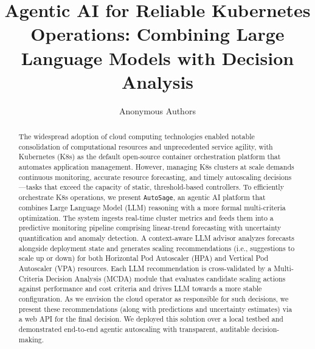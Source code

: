 \documentclass[sigconf]{acmart}
\newcommand{\Solution}{\texttt{AutoSage}}
\begin{document}
\title{Agentic AI for Reliable Kubernetes Operations: Combining Large Language Models with Decision Analysis
}

\author{Anonymous Authors}

\begin{abstract}
The widespread adoption of cloud computing technologies enabled notable consolidation of computational resources and unprecedented service agility, with Kubernetes (K8s) as the default open-source container orchestration platform that automates application management. However, managing K8s clusters at scale demands continuous monitoring, accurate resource forecasting, and timely autoscaling decisions---tasks that exceed the capacity of static, threshold-based controllers. To efficiently orchestrate K8s operations, we present \Solution, an agentic AI platform that combines Large Language Model (LLM) reasoning with a more formal multi-criteria optimization. The system ingests real-time cluster metrics %
and feeds them into a predictive monitoring pipeline comprising linear-trend forecasting with %
uncertainty quantification and %
anomaly detection. %
A context-aware LLM advisor analyzes forecasts alongside deployment state and generates scaling recommendations (i.e., suggestions to scale up or down) for both Horizontal Pod Autoscaler (HPA) and Vertical Pod Autoscaler (VPA) resources. Each LLM recommendation is cross-validated by a %
Multi-Criteria Decision Analysis (MCDA) module that evaluates candidate scaling actions against performance and cost criteria %
and drives LLM towards a more stable configuration.
As we envision the cloud operator as responsible for such decisions, we present these recommendations (along with predictions and uncertainty estimates) via a web API for the final decision.
We deployed this solution over a local testbed and demonstrated end-to-end agentic autoscaling with transparent, auditable decision-making.
\end{abstract}
\end{document}
